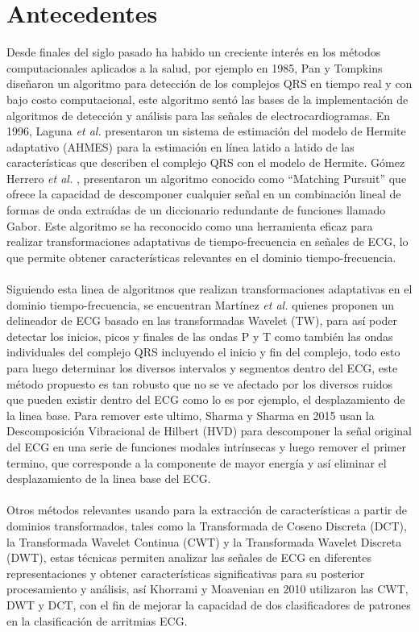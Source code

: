 \documentclass[spanish,11pt,letterpaper,oneside]{memoir}
\begin{document}
\section{Antecedentes}
    Desde finales del siglo pasado ha habido un creciente interés en los métodos computacionales aplicados a la salud, por ejemplo en 1985, Pan y Tompkins \cite{PanTompkins85} diseñaron un algoritmo para detección de los complejos QRS en tiempo real y con bajo costo computacional, este algoritmo sentó las bases de la implementación de algoritmos de detección y análisis para las señales de electrocardiogramas. En 1996, Laguna \textit{et al.} \cite{Laguna97} presentaron un sistema de estimación del modelo de Hermite adaptativo (AHMES) para la estimación en línea latido a latido de las características que describen el complejo QRS con el modelo de Hermite. Gómez Herrero \textit{et al.} \cite{Herrero05}, presentaron un algoritmo conocido como ``Matching Pursuit'' que ofrece la capacidad de descomponer cualquier señal en un combinación lineal de formas de onda extraídas de un diccionario redundante de funciones llamado Gabor. Este algoritmo se ha reconocido como una herramienta eficaz para realizar transformaciones adaptativas de tiempo-frecuencia en señales de ECG, lo que permite obtener características relevantes en el dominio tiempo-frecuencia. \\
    \\
    Siguiendo esta linea de algoritmos que realizan transformaciones adaptativas en el dominio tiempo-frecuencia, se encuentran Martínez \textit{et al.} \cite{Martinez04} quienes proponen un delineador de ECG basado en las transformadas Wavelet (TW), para así poder detectar los inicios, picos y finales de las ondas P y T como también las ondas individuales del complejo QRS incluyendo el inicio y fin del complejo, todo esto para luego determinar los diversos intervalos y segmentos dentro del ECG, este método propuesto es tan robusto que no se ve afectado por los diversos ruidos que pueden existir dentro del ECG como lo es por ejemplo, el desplazamiento de la linea base. Para remover este ultimo, Sharma y Sharma en 2015 \cite{Sharma15} usan la Descomposición Vibracional de Hilbert (HVD) para descomponer la señal original del ECG en una serie de funciones modales intrínsecas y luego remover el primer termino, que corresponde a la componente de mayor energía y así eliminar el desplazamiento de la linea base del ECG. \\
    \\
    Otros métodos relevantes usando para la extracción de características a partir de dominios transformados, tales como la Transformada de Coseno Discreta (DCT), la Transformada Wavelet Continua (CWT) y la Transformada Wavelet Discreta (DWT), estas técnicas permiten analizar las señales de ECG en diferentes representaciones y obtener características significativas para su posterior procesamiento y análisis, así Khorrami y Moavenian en 2010 \cite{Khorrami10} utilizaron las CWT, DWT y DCT, con el fin de mejorar la capacidad de dos clasificadores de patrones en la clasificación de arritmias ECG. \\
\end{document}
